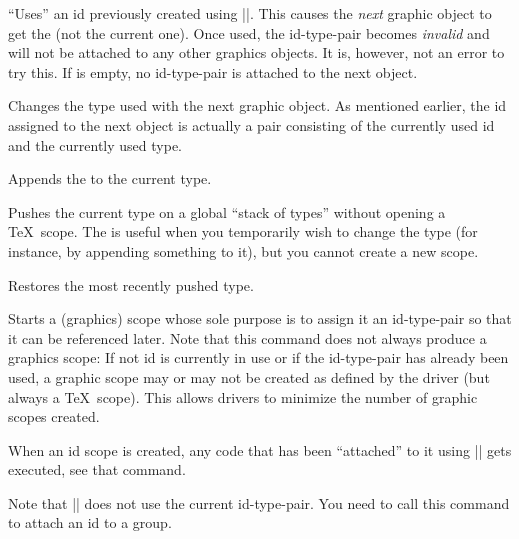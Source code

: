 \begin{command}{\pgfsys@use@id{}}
  ``Uses'' an id previously created using |\pgfsys@new@id|. This
  causes the \emph{next} graphic object to get the  (not the
  current one). Once used, the id-type-pair becomes \emph{invalid} and
  will not be attached to any other graphics objects. It is, however,
  not an error to try this. If  is empty, no id-type-pair is
  attached to the next object.
\end{command}

\begin{command}{\pgfsys@use@type{}}
  Changes the type used with the next graphic object.
  As mentioned earlier, the id assigned to the next object is actually
  a pair consisting of the currently used id and the currently used
  type. 
\end{command}

\begin{command}{\pgfsys@append@type{}}
  Appends the  to the current type. 
\end{command}

\begin{command}{\pgfsys@push@type}
  Pushes the current type on a global ``stack of types'' without
  opening a \TeX\ scope. The is useful when you temporarily wish to
  change the type (for instance, by appending something to it), but
  you cannot create a new scope.
\end{command}

\begin{command}{\pgfsys@pop@type}
  Restores the most recently pushed type.
\end{command}

\begin{command}{\pgfsys@begin@idscope}
  Starts a (graphics) scope whose sole purpose is to assign it an
  id-type-pair so that it can be referenced later. Note that this
  command does not always produce a graphics scope: If not id is
  currently in use or if the id-type-pair has already been used,
  a graphic scope may or may not be created as defined by the driver
  (but always a \TeX\ scope). This allows drivers to minimize the
  number of graphic scopes created.

  When an id scope is created, any code that has been ``attached'' to
  it using |\pgfsys@attach@to@id| gets executed, see that command.

  Note that |\pgfsys@beginscope| does not use the current
  id-type-pair. You need to call this command to attach an id to a
  group. 
\end{command}

